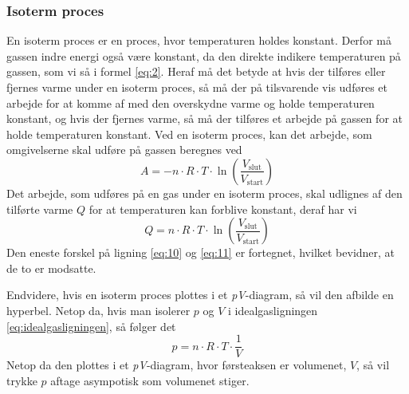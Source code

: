 \documentclass[12pt,a4paper]{article}
\begin{document}
			\subsubsection{Isoterm proces}
			En isoterm proces er en proces, hvor temperaturen holdes konstant. 
			Derfor må gassen indre energi også være konstant, da den direkte 
			indikere temperaturen på gassen, som vi så i formel \eqref{eq:2}.
			Heraf må det betyde at hvis der tilføres eller fjernes varme under en 
			isoterm proces, så må der på tilsvarende vis udføres et arbejde for
			at komme af med den overskydne varme og holde temperaturen konstant,
			og hvis der fjernes varme, så må der tilføres et arbejde på gassen
			for at holde temperaturen konstant. Ved en isoterm proces, kan det 
			arbejde, som omgivelserne skal udføre på gassen beregnes ved
			\begin{equation}
				A = -n \cdot R \cdot T \cdot \ln\left(\frac{V_{\text{slut}}}{V_{\text{start}}}\right)
				\label{eq:10}
			\end{equation}
			Det arbejde, som udføres på en gas under en isoterm proces, skal 
			udlignes af den tilførte varme \(Q\) for at temperaturen kan forblive
			konstant, deraf har vi
			\begin{equation}
				Q = n \cdot R \cdot T \cdot \ln\left(\frac{V_{\text{slut}}}{V_{\text{start}}}\right)
				\label{eq:11}
			\end{equation}
			Den eneste forskel på ligning \eqref{eq:10} og \eqref{eq:11} er fortegnet,
			hvilket bevidner, at de to er modsatte.
			
			Endvidere, hvis en isoterm proces plottes i et \textit{pV}-diagram, så 
			vil den afbilde en hyperbel. Netop da, hvis man isolerer \(p\) og \(V\)
			i idealgasligningen \eqref{eq:idealgasligningen}, så følger det
			\begin{equation}
				p = n \cdot R \cdot T \cdot \frac{1}{V}
			\end{equation}
			Netop da den plottes i et \textit{pV}-diagram, hvor førsteaksen er volumenet,
			\(V\), så vil trykke \(p\) aftage asympotisk som volumenet stiger. 
\end{document}
